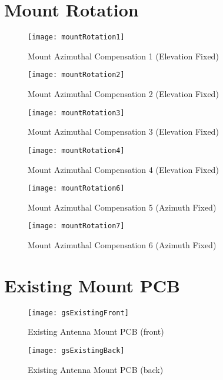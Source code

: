 \section{Mount Rotation}\label{sec:appendix_mount_rotation}
\begin{figure}[!htb]
  \begin{minipage}{.32\textwidth}
    \centering
    \texttt{[image: mountRotation1]}
    \caption{Mount Azimuthal Compensation 1 (Elevation Fixed)}
    \label{fig:mountCompensation1}
  \end{minipage}
  \begin{minipage}{.32\textwidth}
    \centering
    \texttt{[image: mountRotation2]}
    \caption{Mount Azimuthal Compensation 2 (Elevation Fixed)}
    \label{fig:mountCompensation2}
  \end{minipage}
  \begin{minipage}{.32\textwidth}
    \centering
    \texttt{[image: mountRotation3]}
    \caption{Mount Azimuthal Compensation 3 (Elevation Fixed)}
    \label{fig:mountCompensation3}
  \end{minipage}
\end{figure}
\begin{figure}[!htb]
  \begin{minipage}{.32\textwidth}
    \centering
    \texttt{[image: mountRotation4]}
    \caption{Mount Azimuthal Compensation 4 (Elevation Fixed)}
    \label{fig:mountCompensation4}
  \end{minipage}
  \begin{minipage}{.32\textwidth}
    \centering
    \texttt{[image: mountRotation6]}
    \caption{Mount Azimuthal Compensation 5 (Azimuth Fixed)}
    \label{fig:mountCompensation5}
  \end{minipage}
  \begin{minipage}{.32\textwidth}
    \centering
    \texttt{[image: mountRotation7]}
    \caption{Mount Azimuthal Compensation 6 (Azimuth Fixed)}
    \label{fig:mountCompensation6}
  \end{minipage}
\end{figure}


\section{Existing Mount PCB}\label{sec:appendix_gs_pcb_existing}
\begin{figure}[!htb]
  \centering
  \texttt{[image: gsExistingFront]}
  \caption{Existing Antenna Mount PCB (front)}
  \label{fig:gsExistingFront}
\end{figure}
\begin{figure}[!htb]
  \centering
  \texttt{[image: gsExistingBack]}
  \caption{Existing Antenna Mount PCB (back)}
  \label{fig:gsExistingBack}
\end{figure}
\newpage

